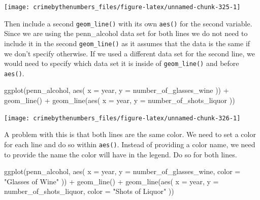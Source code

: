 \documentclass[
  a4paper,
]{krantz}
\makeatletter
\newenvironment{Shaded}{\begin{snugshade}}{\end{snugshade}}
\newcommand{\AttributeTok}[1]{\textcolor[rgb]{0.61,0.61,0.61}{#1}}
\newcommand{\FunctionTok}[1]{\textcolor[rgb]{0,0,0}{#1}}
\newcommand{\NormalTok}[1]{#1}
\newcommand{\SpecialCharTok}[1]{\textcolor[rgb]{0,0,0}{#1}}
\newcommand{\StringTok}[1]{\textcolor[rgb]{0.5,0.5,0.5}{#1}}
\newenvironment{kframe}{%
\medskip{}
\setlength{\fboxsep}{.8em}
 \def\at@end@of@kframe{}%
 \ifinner\ifhmode%
  \def\at@end@of@kframe{\end{minipage}}%
  \begin{minipage}{\columnwidth}%
 \fi\fi%
 \def\FrameCommand##1{\hskip\@totalleftmargin \hskip-\fboxsep
 \colorbox{shadecolor}{##1}\hskip-\fboxsep
     \hskip-\linewidth \hskip-\@totalleftmargin \hskip\columnwidth}%
 \MakeFramed {\advance\hsize-\width
   \@totalleftmargin\z@ \linewidth\hsize
   \@setminipage}}%
 {\par\unskip\endMakeFramed%
 \at@end@of@kframe}
\renewenvironment{Shaded}{\begin{kframe}}{\end{kframe}}
\makeatother
\begin{document}
\begin{center}\texttt{[image: crimebythenumbers\_files/figure-latex/unnamed-chunk-325-1]} \end{center}

Then include a second \texttt{geom\_line()} with its own
\texttt{aes()} for the second variable. Since we are using
the penn\_alcohol data set for both lines we do not need to
include it in the second \texttt{geom\_line()} as it assumes
that the data is the same if we don't specify otherwise. If
we used a different data set for the second line, we would
need to specify which data set it is inside of
\texttt{geom\_line()} and before \texttt{aes()}.

\begin{Shaded}
\begin{Highlighting}[]
\FunctionTok{ggplot}\NormalTok{(penn\_alcohol, }\FunctionTok{aes}\NormalTok{(}
  \AttributeTok{x =}\NormalTok{ year,}
  \AttributeTok{y =}\NormalTok{ number\_of\_glasses\_wine}
\NormalTok{)) }\SpecialCharTok{+}
  \FunctionTok{geom\_line}\NormalTok{() }\SpecialCharTok{+}
  \FunctionTok{geom\_line}\NormalTok{(}\FunctionTok{aes}\NormalTok{(}
    \AttributeTok{x =}\NormalTok{ year,}
    \AttributeTok{y =}\NormalTok{ number\_of\_shots\_liquor}
\NormalTok{  ))}
\end{Highlighting}
\end{Shaded}

\begin{center}\texttt{[image: crimebythenumbers\_files/figure-latex/unnamed-chunk-326-1]} \end{center}

A problem with this is that both lines are the same color.
We need to set a color for each line and do so within
\texttt{aes()}. Instead of providing a color name, we need
to provide the name the color will have in the legend. Do so
for both lines.

\begin{Shaded}
\begin{Highlighting}[]
\FunctionTok{ggplot}\NormalTok{(penn\_alcohol, }\FunctionTok{aes}\NormalTok{(}
  \AttributeTok{x =}\NormalTok{ year,}
  \AttributeTok{y =}\NormalTok{ number\_of\_glasses\_wine,}
  \AttributeTok{color =} \StringTok{"Glasses of Wine"}
\NormalTok{)) }\SpecialCharTok{+}
  \FunctionTok{geom\_line}\NormalTok{() }\SpecialCharTok{+}
  \FunctionTok{geom\_line}\NormalTok{(}\FunctionTok{aes}\NormalTok{(}
    \AttributeTok{x =}\NormalTok{ year,}
    \AttributeTok{y =}\NormalTok{ number\_of\_shots\_liquor,}
    \AttributeTok{color =} \StringTok{"Shots of Liquor"}
\NormalTok{  ))}
\end{Highlighting}
\end{Shaded}
\end{document}
